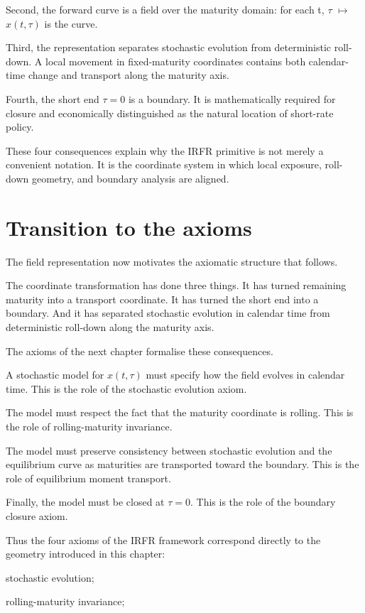 \documentclass[11pt,oneside]{book}
\begin{document}
Second, the forward curve is a field over the maturity domain: for each
t, $\tau$ $\mapsto$ $x(t,\tau)$ is the curve.

Third, the representation separates stochastic evolution from
deterministic roll-down. A local movement in fixed-maturity coordinates
contains both calendar-time change and transport along the maturity
axis.

Fourth, the short end $\tau=0$ is a boundary. It is mathematically required
for closure and economically distinguished as the natural location of
short-rate policy.

These four consequences explain why the IRFR primitive is not merely a
convenient notation. It is the coordinate system in which local
exposure, roll-down geometry, and boundary analysis are aligned.

\section{Transition to the axioms}\label{transition-to-the-axioms}

The field representation now motivates the axiomatic structure that
follows.

The coordinate transformation has done three things. It has turned
remaining maturity into a transport coordinate. It has turned the short
end into a boundary. And it has separated stochastic evolution in
calendar time from deterministic roll-down along the maturity axis.

The axioms of the next chapter formalise these consequences.

A stochastic model for $x(t,\tau)$ must specify how the field evolves in
calendar time. This is the role of the stochastic evolution axiom.

The model must respect the fact that the maturity coordinate is rolling.
This is the role of rolling-maturity invariance.

The model must preserve consistency between stochastic evolution and the
equilibrium curve as maturities are transported toward the boundary.
This is the role of equilibrium moment transport.

Finally, the model must be closed at $\tau=0$. This is the role of the
boundary closure axiom.

Thus the four axioms of the IRFR framework correspond directly to the
geometry introduced in this chapter:

stochastic evolution;

rolling-maturity invariance;
\end{document}
